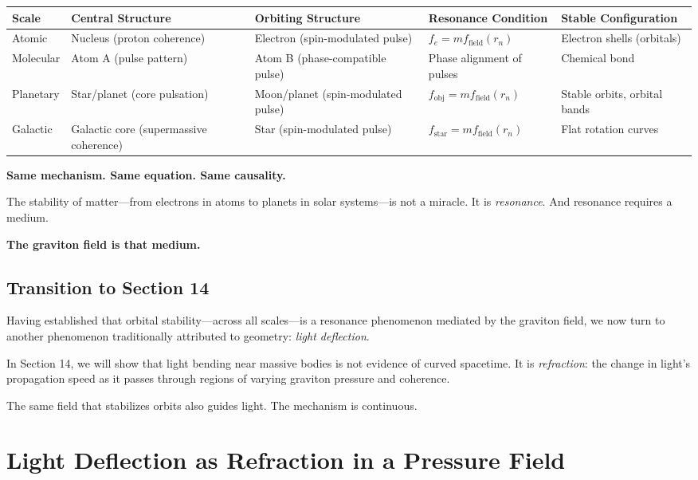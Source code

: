 \documentclass[12pt, a4paper]{article}
\begin{document}
\begin{center}
\small
\begin{tabular}{|p{1.6cm}|p{3cm}|p{3cm}|p{3.2cm}|p{2.8cm}|}
\hline
\textbf{Scale} & \textbf{Central Structure} & \textbf{Orbiting Structure} & \textbf{Resonance Condition} & \textbf{Stable Configuration} \\
\hline
Atomic & Nucleus (proton coherence) & Electron (spin-modulated pulse) & \( f_e = m f_{\text{field}}(r_n) \) & Electron shells (orbitals) \\
\hline
Molecular & Atom A (pulse pattern) & Atom B (phase-compatible pulse) & Phase alignment of pulses & Chemical bond \\
\hline
Planetary & Star/planet (core pulsation) & Moon/planet (spin-modulated pulse) & \( f_{\text{obj}} = m f_{\text{field}}(r_n) \) & Stable orbits, orbital bands \\
\hline
Galactic & Galactic core (supermassive coherence) & Star (spin-modulated pulse) & \( f_{\text{star}} = m f_{\text{field}}(r_n) \) & Flat rotation curves \\
\hline
\end{tabular}
\end{center}

\textbf{Same mechanism. Same equation. Same causality.}

The stability of matter—from electrons in atoms to planets in solar systems—is not a miracle. It is \textit{resonance}. And resonance requires a medium.

\textbf{The graviton field is that medium.}

\subsection{Transition to Section 14}
\label{subsec:transition_14}

Having established that orbital stability—across all scales—is a resonance phenomenon mediated by the graviton field, we now turn to another phenomenon traditionally attributed to geometry: \textit{light deflection}.

In Section 14, we will show that light bending near massive bodies is not evidence of curved spacetime. It is \textit{refraction}: the change in light's propagation speed as it passes through regions of varying graviton pressure and coherence.

The same field that stabilizes orbits also guides light. The mechanism is continuous.

\section{Light Deflection as Refraction in a Pressure Field}
\label{sec:light_deflection}
\end{document}
